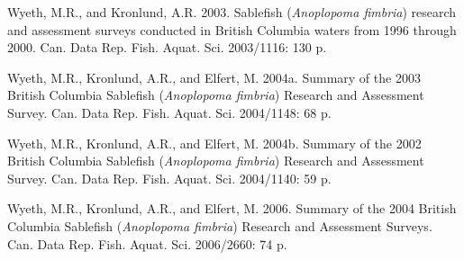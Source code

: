 \documentclass[12pt]{article}\usepackage[]{graphicx}\usepackage[]{color}
\begin{document}
\leavevmode\hypertarget{ref-Wyeth2003}{}%
Wyeth, M.R., and Kronlund, A.R. 2003. Sablefish (\emph{Anoplopoma fimbria}) research and assessment surveys conducted in British Columbia waters from 1996 through 2000. Can. Data Rep. Fish. Aquat. Sci. 2003/1116: 130 p.

\leavevmode\hypertarget{ref-Wyeth2004b}{}%
Wyeth, M.R., Kronlund, A.R., and Elfert, M. 2004a. Summary of the 2003 British Columbia Sablefish (\emph{Anoplopoma fimbria}) Research and Assessment Survey. Can. Data Rep. Fish. Aquat. Sci. 2004/1148: 68 p.

\leavevmode\hypertarget{ref-Wyeth2004a}{}%
Wyeth, M.R., Kronlund, A.R., and Elfert, M. 2004b. Summary of the 2002 British Columbia Sablefish (\emph{Anoplopoma fimbria}) Research and Assessment Survey. Can. Data Rep. Fish. Aquat. Sci. 2004/1140: 59 p.

\leavevmode\hypertarget{ref-Wyeth2006}{}%
Wyeth, M.R., Kronlund, A.R., and Elfert, M. 2006. Summary of the 2004 British Columbia Sablefish (\emph{Anoplopoma fimbria}) Research and Assessment Surveys. Can. Data Rep. Fish. Aquat. Sci. 2006/2660: 74 p.
\end{document}
